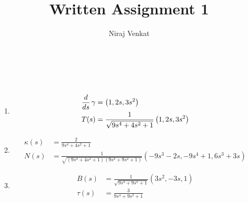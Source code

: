 \documentclass{article}
\def\nt{\notag}
\begin{document}
\title{Written Assignment 1}

\author{Niraj Venkat}

\date{}

\maketitle

\vspace{.8cm}
\\\\

\begin{enumerate}[label=(\alph*)]
    \item
    \begin{align*}
        \frac{d}{ds}\,\gamma &= \left(1,2s,3s^2\right) \\
        T(s) &= \frac{1}{\sqrt{9 s^4+4 s^2+1}} \left(1, 2 s, 3 s^2\right) \nt
    \end{align*}


    \item
    \begin{align*} 
        \kappa(s) &= \frac{2}{9 s^4+4 s^2+1} \\
        N(s) &= \frac{1}{\sqrt{(9 s^4+4 s^2+1)(9 s^4+9 s^2+1)}} \left(-9s^3-2s, -9s^4 + 1, 6s^3 + 3s\right)
    \end{align*}

    \item
    \begin{align*}
        B(s) &= \frac{1}{\sqrt{9 s^4+9 s^2+1}} \left(3s^2,-3s,1\right)\\
        \tau(s) &= \frac{3}{9 s^4+9 s^2+1}
    \end{align*}
\end{enumerate}


\vspace{1.8cm}
\\\\
\end{document}
